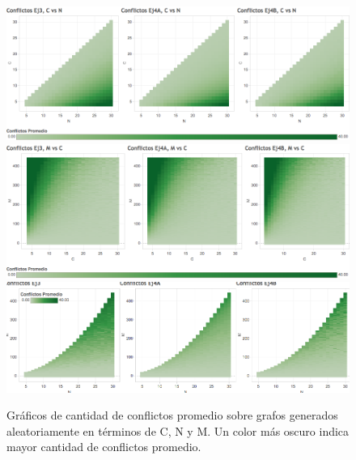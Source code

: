 \documentclass{article}
\theoremstyle{definition}
\theoremstyle{remark}
\begin{document}
\begin{figure}
\centering
\includegraphics[width=15cm]{grf/ConflictosCvsN.png}
\includegraphics[width=15cm]{grf/ConflictosMvsC.png}
\includegraphics[width=15cm]{grf/ConflictosNvsM.png}
\caption{Gráficos de cantidad de conflictos promedio sobre grafos generados aleatoriamente en términos de C, N y M. Un color más oscuro indica mayor cantidad de conflictos promedio.}
\label{grf:heu}
\end{figure}
\end{document}
